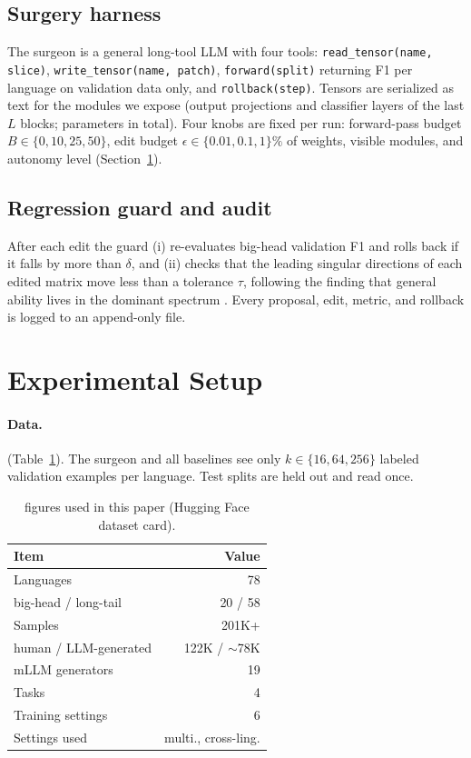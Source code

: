 \documentclass[11pt]{article}
\begin{document}
\subsection{Surgery harness}
The surgeon is a general long-tool LLM with four tools: \texttt{read\_tensor(name, slice)}, \texttt{write\_tensor(name, patch)}, \texttt{forward(split)} returning F1 per language on validation data only, and \texttt{rollback(step)}. Tensors are serialized as text for the modules we expose (output projections and classifier layers of the last $L$ blocks; \xx{} parameters in total). Four knobs are fixed per run: forward-pass budget $B\in\{0,10,25,50\}$, edit budget $\epsilon\in\{0.01,0.1,1\}\%$ of weights, visible modules, and autonomy level (Section~\ref{sec:setup}).

\subsection{Regression guard and audit}
After each edit the guard (i) re-evaluates big-head validation F1 and rolls back if it falls by more than $\delta$, and (ii) checks that the leading singular directions of each edited matrix move less than a tolerance $\tau$, following the finding that general ability lives in the dominant spectrum \citep{zhang2026revive}. Every proposal, edit, metric, and rollback is logged to an append-only file.

\section{Experimental Setup}
\label{sec:setup}
\paragraph{Data.} \bluff{} (Table~\ref{tab:data}). The surgeon and all baselines see only $k\in\{16,64,256\}$ labeled validation examples per language. Test splits are held out and read once.

\begin{table}[t]
\centering\small
\begin{tabular}{lr}
\toprule
Item & Value \\
\midrule
Languages & 78 \\
\quad big-head / long-tail & 20 / 58 \\
Samples & 201K+ \\
\quad human / LLM-generated & 122K / $\sim$78K \\
mLLM generators & 19 \\
Tasks & 4 \\
Training settings & 6 \\
Settings used & multi., cross-ling. \\
\bottomrule
\end{tabular}
\caption{\bluff{} figures used in this paper (Hugging Face dataset card).}
\label{tab:data}
\end{table}
\end{document}
